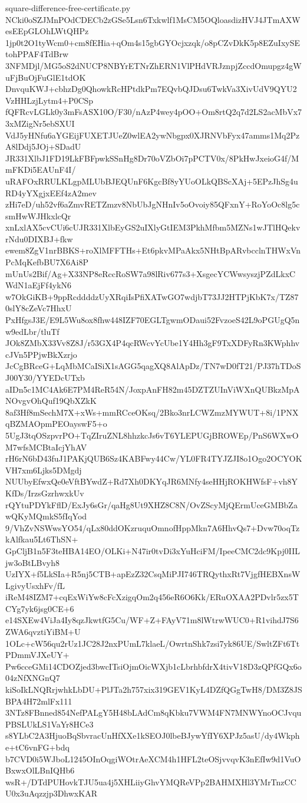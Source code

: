 \documentclass[11pt]{article}
\theoremstyle{definition}
\theoremstyle{remark}
\begin{document}
\begin{filecontents*}[overwrite]{square-difference-free-certificate.py}
NCki0oSZJMnPOdCDECb2zGSe5Lsn6Txkwlf1MsCM5OQloasdizHVJ4JTmAXWesEEpGLOhLWtQHPz
1jp0t2O1tyWcm0+cm8fEHia+qOm4s15gbGYOcjxzqk/o8pCZvDkK5p8EZuIxySEtohPPAF4TdBrw
3NFMDjl/MG5oS2dNUCP8NBYrETNrZhERN1VlPHdVRJznpjZccdOmupgz4gWuFjBuOjFuGlE1tdOK
DnvquKWJ+cbhzDg0QhowkRcHPtdkPm7EQvbQJDsu6TwkVa3XivUdV9QYU2VzHHLzjLytm4+P0CSp
fQFRcvLGLk0y3mFsASX10O/F30/nAzP4wey4pOO+Om8rtQ2q7d2LS2acMbVx73xMZigNr5ebSXUI
VdJ5yHNfu6aYGEijFUXETJUeZ0wlEA2ywNbgpx0XJRNVbFyx47amms1Mq2PzA8lDdj5JOj+SDadU
JR331XlbJ1FD19LkFBFpwkSSnHg8Dr70oVZbOi7pPCTV0x/8PkHwJxeioG4f/MmFKDi5EAUnF4I/
uRAFOxRRULKLgpMLUbBJEQUnF6KgcBf8yYUoOLkQBScXAj+5EPzJhSg4uRD4yYXgjxEEf4zA2mev
zHi7eD/uh52vf6aZmvRETZmzv8NbUbJgNHnIv5oOvoiy85QFxnY+RoYoOc8lg5csmHwWJHkxlcQr
xnLxlAX5cvCUi6cUJR331XlbEyGS2uIXlyGtIEM3PkhMfbm5MZNs1wJTlHQekvrNdu0DIXBJ+fkw
ewem8ZgV1nrBBKS+roXlMFFTHs+Et6pkvMPaAkx5NHtBpARvbcclnTHWxVnPcMqKefbBU7X6Ai8P
mUnUs2Bif/Ag+X33NP8eRccRoSW7a98lRiv677s3+XsgecYCWwsyszjPZdLkxCWdN1aEjFf4ykN6
w7OkGiKB+9ppRcddddzUyXRqiIsPfiXATwGO7wdjbT73JJ2HTPjKbK7x/TZ870slY8cZeVc7HhxU
PxHfgsJ3E/E9L5Wu8ox8fhw448IZF70EGLTgwmODaui52FvzoeS42L9oPGUgQ5nw9edLbr/tluTf
JOk8ZMbX33Vv8Z8J/r53GX4P4qcRWcvYcUbe1Y4Hh3gF9TxXDFyRn3KWphhvcJVn5PPjwBkXzrjo
JcCgBRceG+LqMbMCaISiX1sAGG5qagXQ8AlApDz/TN7wD0fT21/PJ37hTDoSJ00Y30/YYEDcUTxb
aIDn5c1MC4Ak6E7PM4ReR54N/JoxpAnFH82m45DZTZUInViWXnQUBkzMpANOvgvOhQuf19QbXZkK
8af3Hf8mSechM7X+xWs+mmRCceOKsq/2Bko3nrLCWZmzMYWUT+8i/1PNXqBZMAOpmPEOayswF5+o
5UgJ3tqOSzpvrPO+TqZIruZNL8hhzkcJs6vT6YLEPUGjBROWEp/PnS6WXwOM7wfsMCBtaIcjYhAV
rH6rN6bD43fuJ1PAKjQUB6Sz4KABFwy44Cw/YL0FR4TYJZJI8o1Ogo2OCYOKVH7xm6Ljks5DMgdj
NUUbyEfwxQe0eVftBYwdZ+Rd7Xh0DKYqJR6MNfy4seHHjROKHWfsF+vh8YKfDs/IrzsGzrhwxkUv
rQYtuPDYkFflD/ExJy6sGr/qaHg8Ut9XHZ8C8N/OvZScyMjQErmUceGMBbZawQKyMQmkS5fIqYod
9/VhZvNSWwsYO54/qLx80ddOKzruquOmnofHppMkn7A6HhvQs7+Dvw70oqTzkAlfkau5Lt6ThSN+
GpCljB1n5F3teHBA14EO/OLKi+N47ir0tvDi3xYuHciFM/IpeeCMC2dc9Kpj0IILjw3oBtLBvyh8
UzIYX+f5LkSIa+R5nj5CTB+apEzZ32CsqMiPJI746TRQythxRt7VjgfHEBXnsWLgivyUsxhFv/fL
iReM48IZM7+cqExWiYw8cFcXzigqOm2q456eR6O6Kk/ERuOXAA2PDvlr5zx5TCYg7yk6jsg0CE+6
e14SXEw4ViJa4Iy8qzJkwtfG5Cu/WF+Z+FAyV71m8lWtrwWUC0+R1vihdJ7S6ZWA6qvztiYiBM+U
1OLc+cW56qu2rUz1JC28J2nxPUmL7klaeL/OwrtnShk7zsi7yk86UE/SwltZFt6TtPDmmVJXeUY+
Pw6cceGMi14CDOZjed3bwcITsiOjmOicWXjb1cLbrhbfdrX4tivV18D3zQPfGQx6o04zNfXNGnQ7
kiSoIkLNQRrjwhkLbDU+PlJTa2h757xix319GEV1KyL4DZfQGgTwH8/DM3Z8JSBPA4H72mlFx111
3NTz8FBnned854NefPALgY5H48bLAdCm8qKbku7VWM4FN7MNWYnoOCJvquPBSLUkLS1VaYr8HCe3
s8YLbC2A3HjuoBqSbvracUnHfXXe1kSEOJ0lbeBJywYfIY6XPJz5asU/dy4Wkphe+tC6vnFG+bdq
b7CVD0i5WJboL1245OInOqgiWOtrAeXCM4h1HFL2teOSjvvqvK3nEfIw9d1VuOBxwxOlLBnIQHb6
wsR+/DTdPUHovkTJU5ua4j5XHLiiyGhvYMQReVPp2BAHMXHl3YMrTnzCCU0x3uAqzzjp3DhwxKAR

\end{filecontents*}
\end{document}
